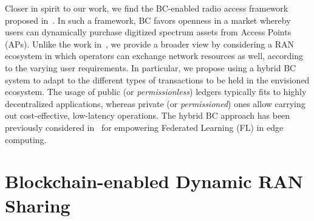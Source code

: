 \documentclass[conference]{IEEEtran}
\theoremstyle{definition}
\begin{document}
Closer in spirit to our work, we find the BC-enabled radio access framework proposed in~\cite{ling2019blockchain}. In such a framework, BC favors openness in a market whereby users can dynamically purchase digitized spectrum assets from Access Points (APs). Unlike the work in~\cite{ling2019blockchain}, we provide a broader view by considering a RAN ecosystem in which operators can exchange network resources as well, according to the varying user requirements. In particular, we propose using a hybrid BC system to adapt to the different types of transactions to be held in the envisioned ecosystem. The usage of public (or \textit{permissionless}) ledgers typically fits to highly decentralized applications, whereas private (or \textit{permissioned}) ones allow carrying out cost-effective, low-latency operations. The hybrid BC approach has been previously considered in~\cite{fan2020hybrid} for empowering Federated Learning (FL) in edge computing. %


\section{Blockchain-enabled Dynamic RAN Sharing}
\label{section:solution_proposal}

\end{document}
